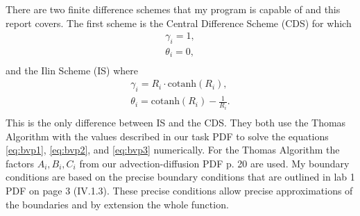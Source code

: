 \documentclass[../00_main.tex]{subfiles}
\begin{document}
There are two finite difference schemes that my program is capable of and
this report covers. The first scheme is the Central Difference Scheme (CDS) for 
which
\begin{equation}\nonumber
    \begin{gathered}
        \gamma_i = 1,  \\
        \theta_i = 0,  \\
    \end{gathered}
\end{equation}
and the Ilin Scheme (IS) where
\begin{equation}\nonumber
    \begin{gathered}
        \gamma_i = R_i \cdot \text{cotanh}(R_i),        \\
        \theta_i =\text{cotanh}(R_i) - \frac{1}{R_i}.   \\
    \end{gathered}
\end{equation}
This is the only difference between IS and the CDS. They both use the Thomas 
Algorithm with the values described in our task PDF to solve the equations 
\eqref{eq:bvp1}, \eqref{eq:bvp2}, and \eqref{eq:bvp3} numerically. For 
the Thomas Algorithm the factors $A_i, B_i, C_i$ from our advection-diffusion
PDF p. 20 are used.
My boundary conditions are based on the precise boundary conditions that are
outlined in lab 1 PDF on page 3 (IV.1.3). These precise conditions allow
precise approximations of the boundaries and by extension the whole function.
\end{document}
